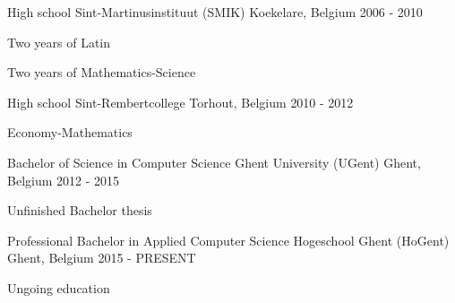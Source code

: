 \begin{cventries}
 \cventry
    {High school}
    {Sint-Martinusinstituut (SMIK)}
    {Koekelare, Belgium}
    {2006 - 2010}
    {
      \begin{cvitems}
        \item {Two years of Latin}
	\item {Two years of Mathematics-Science}
      \end{cvitems}
    }
 \cventry
    {High school}
    {Sint-Rembertcollege}
    {Torhout, Belgium}
    {2010 - 2012}
    {
      \begin{cvitems}
        \item {Economy-Mathematics}
      \end{cvitems}
    }
  \cventry
    {Bachelor of Science in Computer Science}
    {Ghent University (UGent)}
    {Ghent, Belgium}
    {2012 - 2015}
    {
      \begin{cvitems}
        \item {Unfinished Bachelor thesis}
      \end{cvitems}
    }
  \cventry
    {Professional Bachelor in Applied Computer Science}
    {Hogeschool Ghent (HoGent)}
    {Ghent, Belgium}
    {2015 - PRESENT}
    {
      \begin{cvitems}
        \item {Ungoing education}
      \end{cvitems}
    }
\end{cventries}
